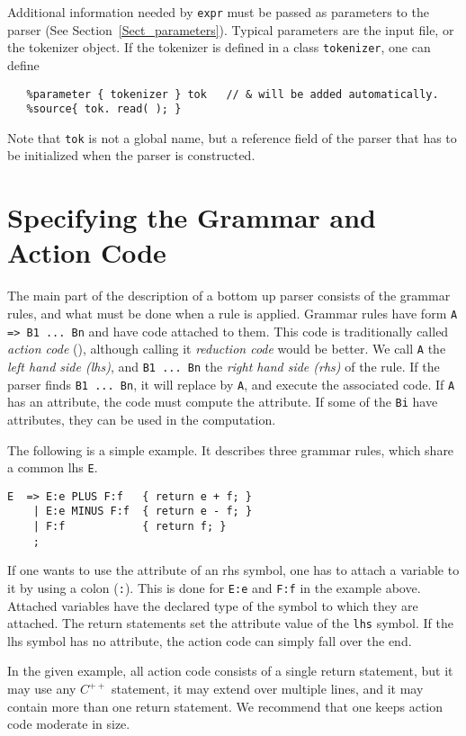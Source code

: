 \documentclass{article}
\begin{document}
Additional information needed by \verb+expr+ must be passed
as parameters to the parser (See Section~\ref{Sect_parameters}).
Typical parameters are the input file, or the tokenizer object.
If the tokenizer is defined in a class \verb+tokenizer+,
one can define  
\begin{verbatim}
   %parameter { tokenizer } tok   // & will be added automatically. 
   %source{ tok. read( ); }
\end{verbatim}
Note that \verb+tok+ is not a global name,
but a reference field of the parser that 
has to be initialized when the parser is constructed. 



\section{Specifying the Grammar and Action Code}

The main part of the description of a bottom up parser
consists of the grammar rules, and what must be done when
a rule is applied.
Grammar rules have form \verb+A => B1 ... Bn+ 
and have code attached to them. This code is traditionally
called \emph{action code} (\cite{Yacc1975}),
although calling it \emph{reduction code} would be better.
We call \verb+A+ the \emph{left hand side (lhs)}, and \verb+B1 ... Bn+
the \emph{right hand side (rhs)} of the rule. 
If the parser finds \verb+B1 ... Bn+, it will replace
by \verb+A+, and execute the associated code. 
If \verb+A+ has an attribute, the code must compute the attribute.
If some of the \verb+Bi+ have attributes, they can
be used in the computation.

The following is a simple example. It describes three grammar rules,
which share a common lhs \verb+E+.
\begin{verbatim}
E  => E:e PLUS F:f   { return e + f; }
    | E:e MINUS F:f  { return e - f; }
    | F:f            { return f; }
    ; \end{verbatim}
If one wants to use the attribute of an rhs symbol, one
has to attach a variable to it by using a colon (\verb+:+). 
This is done for \verb+E:e+ and \verb+F:f+ in the example above. 
Attached variables have the declared type 
of the symbol to which they are attached. The return statements
set the attribute value of the \verb+lhs+ symbol. 
If the lhs symbol has no attribute, the action code can simply
fall over the end.

In the given example, all action code consists of a single return statement,
but it may use any $ C^{++} $ statement, it may extend over 
multiple lines, and it may contain more than one return statement.
We recommend that one keeps action code moderate in size. 
\end{document}
